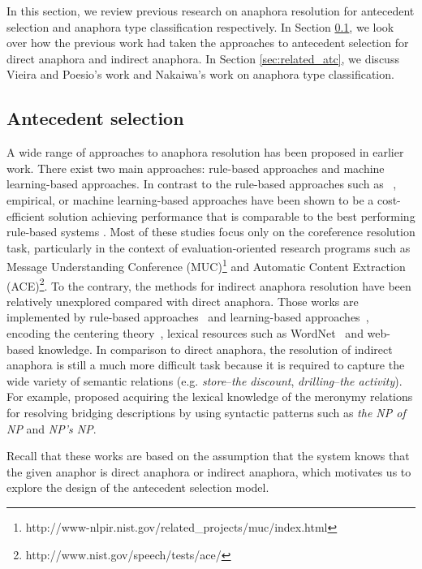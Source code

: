 \documentclass[english]{jnlp_1.4}
\begin{document}
In this section, we review previous research on anaphora resolution
for antecedent selection and anaphora type classification
respectively. In Section \ref{sec:related_as}, we look over how the
previous work had taken the approaches to antecedent selection for
direct anaphora and indirect anaphora. In Section
    \ref{sec:related_atc}, we discuss Vieira and Poesio's work
and Nakaiwa's work on anaphora type
classification.


\subsection{Antecedent selection} \label{sec:related_as}

A wide range of approaches to anaphora resolution has been proposed in
earlier work. There exist two main approaches: rule-based
approaches and machine learning-based approaches. In contrast to the
rule-based approaches such as
~, empirical,
or machine learning-based approaches have been shown to be a cost-efficient
solution achieving performance that is comparable to the best
performing rule-based
systems \cite[etc.]{McCarthy,Ge:98,soon01_coref,1073102,Strube:03,iida05_coref,1075119}. Most
of these studies focus only on the coreference resolution
task, particularly in the context of evaluation-oriented research
programs such as Message Understanding Conference
(MUC)\footnote{http://www-nlpir.nist.gov/related\_projects/muc/index.html}
and Automatic Content Extraction
(ACE)\footnote{http://www.nist.gov/speech/tests/ace/}. To the
contrary, the methods for indirect anaphora resolution have been
relatively unexplored compared with direct anaphora. Those works are
implemented by rule-based
approaches~
and learning-based approaches~, encoding the
centering theory~, lexical resources such
as WordNet~ and web-based knowledge. In
comparison to direct anaphora, the resolution of indirect anaphora is
still a much more difficult task because it is required to capture the
wide variety of semantic relations (e.g. \emph{store}--\emph{the
  discount}, \emph{drilling}--\emph{the activity}). For example,
 proposed acquiring the lexical knowledge of
the meronymy relations for resolving bridging descriptions by using
syntactic patterns such as \emph{the NP of NP} and \emph{NP's NP}.

Recall that these works are based on the assumption that the system
knows that the given anaphor is direct anaphora or indirect anaphora,
which motivates us to explore the design of the antecedent selection
model.
\end{document}
